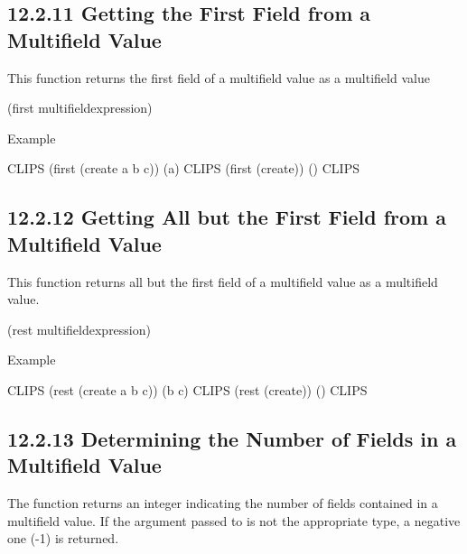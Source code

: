 \documentclass[letterpaper,10pt,english]{sphinxmanual}
\begin{document}
\subsection{12.2.11 Getting the First Field from a Multifield Value}
\label{\detokenize{actions:getting-the-first-field-from-a-multifield-value}}
This function returns the first field of a multifield value as a
multifield value


\begin{sphinxVerbatim}[commandchars=\\\{\}]
(first\PYGZdl{} \PYGZlt{}multifield\PYGZhy{}expression\PYGZgt{})
\end{sphinxVerbatim}

Example

\begin{sphinxVerbatim}[commandchars=\\\{\}]
CLIPS\PYGZgt{} (first\PYGZdl{} (create\PYGZdl{} a b c))
(a)
CLIPS\PYGZgt{} (first\PYGZdl{} (create\PYGZdl{}))
()
CLIPS\PYGZgt{}
\end{sphinxVerbatim}


\subsection{12.2.12 Getting All but the First Field from a Multifield Value}
\label{\detokenize{actions:getting-all-but-the-first-field-from-a-multifield-value}}
This function returns all but the first field of a multifield value as a
multifield value.


\begin{sphinxVerbatim}[commandchars=\\\{\}]
(rest\PYGZdl{} \PYGZlt{}multifield\PYGZhy{}expression\PYGZgt{})
\end{sphinxVerbatim}

Example

\begin{sphinxVerbatim}[commandchars=\\\{\}]
CLIPS\PYGZgt{} (rest\PYGZdl{} (create\PYGZdl{} a b c))
(b c)
CLIPS\PYGZgt{} (rest\PYGZdl{} (create\PYGZdl{}))
()
CLIPS\PYGZgt{}
\end{sphinxVerbatim}


\subsection{12.2.13 Determining the Number of Fields in a Multifield Value}
\label{\detokenize{actions:determining-the-number-of-fields-in-a-multifield-value}}
The  function returns an integer indicating the number of
fields contained in a multifield value. If the argument passed to
 is not the appropriate type, a negative one (-1) is
returned.
\end{document}
